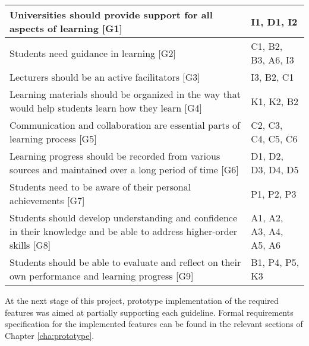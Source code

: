 \begin{center} \small
    \tablelasttail{\hline}
    \begin{supertabular}{|p{9cm}|l|}
     Universities should provide support for all aspects of learning [G1] & I1,
     D1, I2 \\ \hline 
     Students need guidance in learning [G2] & C1, B2, B3, A6, I3 \\ \hline
     Lecturers should be an active facilitators [G3] & I3, B2, C1 \\ \hline
     Learning materials should be organized in the way that would help
students learn how they learn [G4] & K1, K2, B2 \\ \hline
     Communication and collaboration are essential parts of learning
  process [G5] & C2, C3, C4, C5, C6 \\ \hline
     Learning progress should be recorded from various sources and
  maintained over a long period of time [G6] & D1, D2, D3, D4, D5 \\ \hline
     Students need to be aware of their personal achievements [G7] & P1, P2, P3
     \\ \hline 
     Students should develop understanding and confidence in their
  knowledge and be able to address higher-order skills [G8] & A1, A2, A3, A4,
  A5, A6 \\ \hline 
  	Students should be able to evaluate and reflect on their own
  performance and learning progress [G9] & B1, P4, P5, K3 \\ \hline
    \end{supertabular}
    \label{tab:mapping}
\end{center}

At the next stage of this project, prototype implementation of the required
features was aimed at partially supporting each guideline. Formal requirements
specification for the implemented features can be found in the relevant sections
of Chapter \ref{cha:prototype}.

